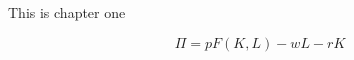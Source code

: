 %
%
%
%
%
%
%
%
%
%




This is chapter one


\begin{equation*}
\Pi = pF(K,L) - wL - rK
\end{equation*}





%
%





